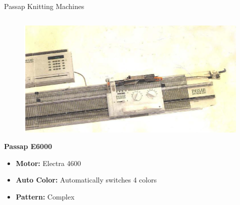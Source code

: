 \documentclass[
    NAME={Dr. Helga Ingimundardóttir},
    EMAIL={helgaingim@hi.is},
    FACULTY={Industrial Engineering},
    TITLE={HiDef Textiles: Reviving Tradition with Innovation},
    SUBTITLE={Empowering Creativity and Sustainability in Textile Production through Digital Transformation},
    SEMINAR={Reykjavík DataBeers},
    DATE={January 25, 2025},
    WIDE={true}
]{HI-LaTeX/hi-beamer}
\begin{document}
\begin{frame}{Passap Knitting Machines}
\begin{columns}
\begin{column}{0.58\textwidth}
    \begin{figure}
\includegraphics[height=0.3\textheight]{include/e6000.png}
    \end{figure}
    \textbf{Passap E6000}
    \begin{itemize}
        \item \textbf{Motor:} Electra 4600
        \item \textbf{Auto Color:} Automatically switches 4 colors
        \item \textbf{Pattern:} Complex
    \end{itemize}
\end{column}

\end{columns}
\end{frame}
\end{document}
